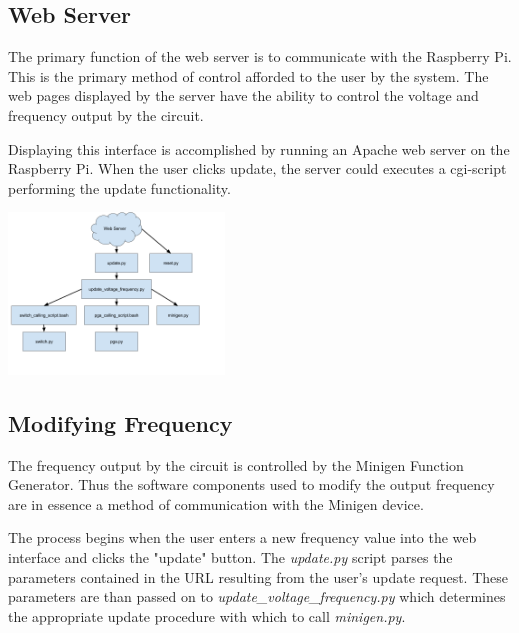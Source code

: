\documentclass{article}	%
\begin{document}
\begin{multicols}{2}
\subsection{Web Server}
The primary function of the web server is to communicate with the Raspberry Pi.
This is the primary method of control afforded 
to the user by the system. 
The web pages displayed by the server
have the ability to control the voltage and frequency output by the circuit.

Displaying this interface is accomplished by 
running an Apache web server on the Raspberry Pi. 
When the user clicks update, the server could executes 
a cgi-script performing the update functionality.

\begin{center}
\includegraphics[width=0.43\textwidth,keepaspectratio]{script_layout.png}
\end{center}

\subsection{Modifying Frequency}
The frequency output by the circuit is controlled 
by the Minigen Function Generator.
Thus the software components used to 
modify the output frequency
are in essence
a method of communication with the Minigen device.

The process begins when the user 
enters a new frequency value into the web interface
and clicks the "update" button.
The \textit{update.py} script parses 
the parameters contained in the URL
resulting from the user's update request.
These parameters are than
passed on to \textit{update\_voltage\_frequency.py}
which determines the appropriate update procedure 
with which to call \textit{minigen.py}.



\end{multicols}
\end{document}
